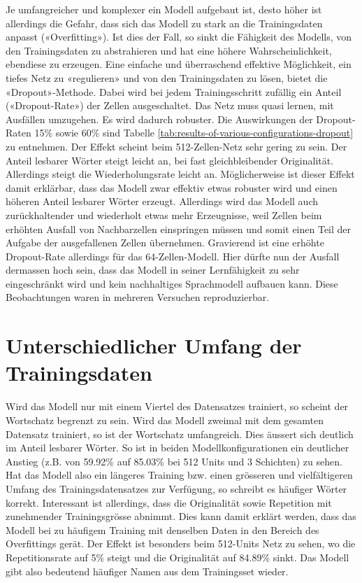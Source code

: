 Je umfangreicher und komplexer ein Modell aufgebaut ist, desto höher ist allerdings die Gefahr, dass sich das Modell zu stark an die Trainingsdaten anpasst («Overfitting»).
Ist dies der Fall, so sinkt die Fähigkeit des Modells, von den Trainingsdaten zu abstrahieren und hat eine höhere Wahrscheinlichkeit, ebendiese zu erzeugen.
Eine einfache und überraschend effektive Möglichkeit, ein tiefes Netz zu «regulieren» und von den Trainingsdaten zu lösen, bietet die «Dropout»-Methode.
Dabei wird bei jedem Trainingsschritt zufällig ein Anteil («Dropout-Rate») der Zellen ausgeschaltet.
Das Netz muss quasi lernen, mit Ausfällen umzugehen.
Es wird dadurch robuster\autocite{JMLR:v15:srivastava14a}.
Die Auswirkungen der Dropout-Raten 15\% sowie 60\% sind Tabelle \ref{tab:results-of-various-configurations-dropout} zu entnehmen.
Der Effekt scheint beim 512-Zellen-Netz sehr gering zu sein.
Der Anteil lesbarer Wörter steigt leicht an, bei fast gleichbleibender Originalität.
Allerdings steigt die Wiederholungsrate leicht an.
Möglicherweise ist dieser Effekt damit erklärbar, dass das Modell zwar effektiv etwas robuster wird und einen höheren Anteil lesbarer Wörter erzeugt.
Allerdings wird das Modell auch zurückhaltender und wiederholt etwas mehr Erzeugnisse, weil Zellen beim erhöhten Ausfall von Nachbarzellen einspringen müssen und somit einen Teil der Aufgabe der ausgefallenen Zellen übernehmen.
Gravierend ist eine erhöhte Dropout-Rate allerdings für das 64-Zellen-Modell.
Hier dürfte nun der Ausfall dermassen hoch sein, dass das Modell in seiner Lernfähigkeit zu sehr eingeschränkt wird und kein nachhaltiges Sprachmodell aufbauen kann.
Diese Beobachtungen waren in mehreren Versuchen reproduzierbar.


\section{Unterschiedlicher Umfang der Trainingsdaten}
\label{sec:increase-num-dataset}

Wird das Modell nur mit einem Viertel des Datensatzes trainiert, so scheint der Wortschatz begrenzt zu sein.
Wird das Modell zweimal mit dem gesamten Datensatz trainiert, so ist der Wortschatz umfangreich.
Dies äussert sich deutlich im Anteil lesbarer Wörter.
So ist in beiden Modellkonfigurationen ein deutlicher Anstieg (z.B. von 59.92\% auf 85.03\% bei 512 Units und 3 Schichten) zu sehen.
Hat das Modell also ein längeres Training bzw. einen grösseren und vielfältigeren Umfang des Trainingsdatensatzes zur Verfügung, so
schreibt es häufiger Wörter korrekt.
Interessant ist allerdings, dass die Originalität sowie Repetition mit zunehmender Trainingsgrösse abnimmt.
Dies kann damit erklärt werden, dass das Modell bei zu häufigem Training mit denselben Daten in den Bereich des Overfittings gerät.
Der Effekt ist besonders beim 512-Units Netz zu sehen, wo die Repetitionsrate auf 5\% steigt und die Originalität auf 84.89\% sinkt.
Das Modell gibt also bedeutend häufiger Namen aus dem Trainingsset wieder.


